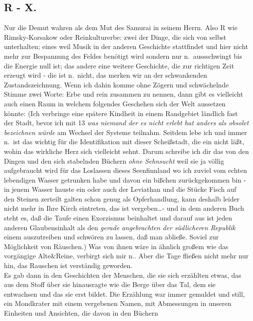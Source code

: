 \documentclass[
]{article}
\author{}
\date{\vspace{-2.5em}}
\begin{document}
\subsection{R - X.}\label{r---x.}

Nur die Demut wahren als dem Mut des Samurai in seinem Herrn. Also R wie
Rimsky-Korsakow oder Reinkulturerbe: zwei der Dinge, die sich von selbst
unterhalten; eines weil Musik in der anderen Geschichte stattfindet und
hier nicht mehr zur Bespannung des Feldes benötigt wird sondern nur
n.~aussschwingt bis die Energie null ist; das andere eine weitere
Geschichte, die zur richtigen Zeit erzeugt wird - die ist n.~nicht, das
merken wir an der schwankenden Zustandszeichnung. Wenn ich dahin komme
ohne Zögern und schwächelnde Stimme zwei Worte: Erbe und rein zusammen
zu nennen, dann gibt es vielleicht auch einen Raum in welchem folgendes
Geschehen sich der Welt aussetzen könnte: (Ich verbringe eine spätere
Kindheit in einem Randgebiet ländlich fast der Stadt, bevor ich mit 13
\emph{was niemand der es nicht erlebt hat anders als obsolet bezeichnen
würde }am Wechsel der Systeme teilnahm. Seitdem lebe ich und immer
n.~ist das wichtig für die Identifikation mit dieser Scheißstadt, die
ein nicht läßt, wohin das wirkliche Herz sich vielleicht sehnt. Darum
schreibe ich dir das von den Dingen und den sich stabelnden Büchern
\emph{ohne Sehnsucht }weil sie ja völlig aufgebraucht wird für das
Loslassen dieses Seenfinnland wo ich zuviel vom echten lebendigen Wasser
getrunken habe und davon ein bißchen zurückgekommen bin - in jenem
Wasser hauste ein oder auch der Leviathan und die Stücke Fisch auf den
Steinen zerteilt galten schon genug als Opferhandlung, kann deshalb
leider nicht mehr in Ihre Kirch eintreten, das ist vergeben\ldots- und
in dem anderen Buch steht es, daß die Taufe einen Exorzismus beinhaltet
und darauf aus ist jeden anderen Glaubensinhalt als den \emph{gerade
angebrachten der südlicheren Republik} einem auszutreiben und schwören
zu lassen, daß man abließe. Soviel zur Möglichkeit von Räuschen.) Was
von ihnen wäre in ähnlich großem wie das vorgängige Alte\&Reine,
verbirgt sich mir n.. Aber die Tage fließen nicht mehr nur hin, das
Rauschen ist verständig geworden.\\
Es gab dann in den Geschichten der Menschen, die sie sich erzählten
etwas, das aus dem Stoff über sie hinausragte wie die Berge über das
Tal, dem sie entwachsen und das sie erst bildet. Die Erzählung war immer
gemuldet und still, ein Mondkrater mit einem vergebenen Namen, mit
Abmessungen in unseren Einheiten und Ansichten, die davon in den Büchern
\end{document}
